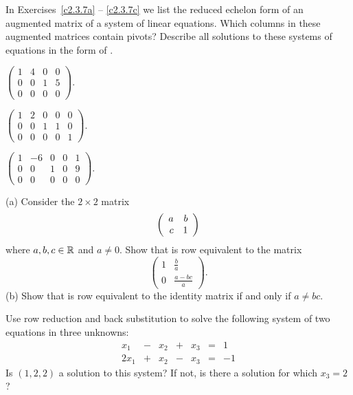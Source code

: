 \documentclass{ximera}
\begin{document}
\noindent In Exercises~\ref{c2.3.7a} -- \ref{c2.3.7c} we list
the reduced echelon form of an augmented matrix of a system of
linear equations.  Which columns in these augmented matrices
contain pivots?  Describe all solutions to these systems of
equations in the form of .
\begin{exercise} \label{c2.3.7a}
$\left(\begin{array}{rrr|r}
 1  &  4 & 0 & 0\\
 0  &  0 & 1 & 5\\
 0  &  0 & 0 & 0
\end{array}\right)$.
\end{exercise}
\begin{exercise} \label{c2.3.7b}
$\left(\begin{array}{rrrr|r}
 1  &  2 & 0 & 0 & 0\\
 0  &  0 & 1 & 1 & 0\\
 0  &  0 & 0 & 0 & 1
\end{array}\right)$.
\end{exercise}
\begin{exercise} \label{c2.3.7c}
$\left(\begin{array}{rrrr|r}
 1  & -6 & 0 & 0 & 1\\
 0  &  0 & 1 & 0 & 9 \\
 0  &  0 & 0 & 0 & 0
\end{array}\right)$.
\end{exercise}


\begin{exercise} \label{c2.3.8}
(a) Consider the $2\times 2$ matrix
\begin{equation}  \label{e:2x2}
\left(\begin{array}{rr} a & b\\ c &1\end{array}\right)
\end{equation}
where $a,b,c\in\mbox{$\Bbb{R}$}$ and $a\neq 0$.  Show that 
is row equivalent to the matrix
\[
\left(\begin{array}{cc} 1 & \frac{b}{a} \\ 0 & \frac{a-bc}{a}
\end{array} \right).
\]
(b)  Show that  is row equivalent to the
identity matrix if and only if $a\neq bc$.
\end{exercise}

\begin{exercise} \label{c2.3.9}
Use row reduction and back substitution to solve the following
system of two equations in three unknowns:
\[
\begin{array}{rcrcrcrc}
 x_1 & - & x_2 & + & x_3 & = & 1 \\
2x_1 & + & x_2 & - & x_3 & = & -1
\end{array}
\]
Is $(1,2,2)$ a solution to this system?  If not, is there a
solution for which $x_3=2$?
\end{exercise}
\end{document}
